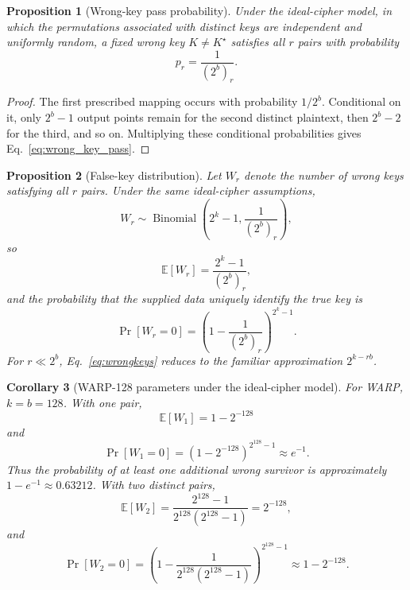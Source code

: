 \documentclass[10pt,a4paper]{article}
\newcommand{\E}{\mathbb{E}}
\newcommand{\Prb}{\Pr}
\newtheorem{proposition}{Proposition}
\newtheorem{corollary}[proposition]{Corollary}
\begin{document}
\begin{proposition}[Wrong-key pass probability]
Under the ideal-cipher model, in which the permutations associated with distinct keys are independent and uniformly random, a fixed wrong key $K\neq K^\star$ satisfies all $r$ pairs with probability
\begin{equation}
    p_r=\frac{1}{(2^b)_r}.
    \label{eq:wrong_key_pass}
\end{equation}
\end{proposition}
\begin{proof}
The first prescribed mapping occurs with probability $1/2^b$.  Conditional on it, only $2^b-1$ output points remain for the second distinct plaintext, then $2^b-2$ for the third, and so on.  Multiplying these conditional probabilities gives Eq.~\eqref{eq:wrong_key_pass}.
\end{proof}

\begin{proposition}[False-key distribution]
Let $W_r$ denote the number of wrong keys satisfying all $r$ pairs.  Under the same ideal-cipher assumptions,
\begin{equation}
    W_r\sim\operatorname{Binomial}\!\left(2^k-1,\frac{1}{(2^b)_r}\right),
    \label{eq:falsekey_binomial}
\end{equation}
so
\begin{equation}
    \E[W_r]=\frac{2^k-1}{(2^b)_r},
    \label{eq:wrongkeys}
\end{equation}
and the probability that the supplied data uniquely identify the true key is
\begin{equation}
    \Prb[W_r=0]=
    \left(1-\frac{1}{(2^b)_r}\right)^{2^k-1}.
    \label{eq:unique_key_probability}
\end{equation}
For $r\ll2^b$, Eq.~\eqref{eq:wrongkeys} reduces to the familiar approximation $2^{k-rb}$.
\end{proposition}

\begin{corollary}[WARP-128 parameters under the ideal-cipher model]
For WARP, $k=b=128$.  With one pair,
\begin{equation}
    \E[W_1]=1-2^{-128}
\end{equation}
and
\begin{equation}
    \Prb[W_1=0]=
    \left(1-2^{-128}\right)^{2^{128}-1}\approx e^{-1}.
\end{equation}
Thus the probability of at least one additional wrong survivor is approximately $1-e^{-1}\approx0.63212$.  With two distinct pairs,
\begin{equation}
    \E[W_2]
    =\frac{2^{128}-1}{2^{128}(2^{128}-1)}
    =2^{-128},
\end{equation}
and
\begin{equation}
    \Prb[W_2=0]
    =\left(1-\frac{1}{2^{128}(2^{128}-1)}\right)^{2^{128}-1}
    \approx 1-2^{-128}.
\end{equation}
\end{corollary}
\end{document}
